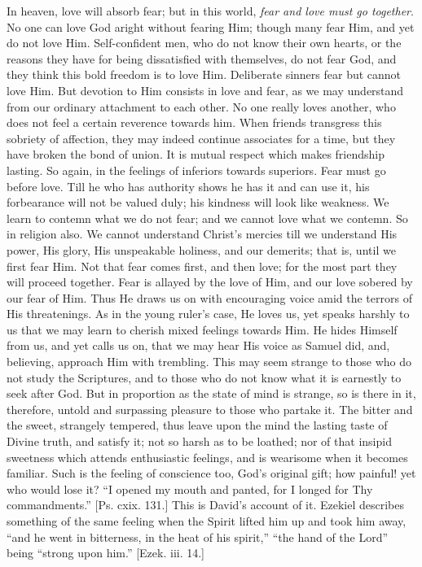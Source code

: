 In heaven, love will absorb fear; but in this world, \emph{fear
and love must go together}. No one can love God aright
without fearing Him; though many fear Him, and yet do not
love Him. Self-confident men, who do not know their own
hearts, or the reasons they have for being dissatisfied
with themselves, do not fear God, and they think this
bold freedom is to love Him. Deliberate sinners fear but
cannot love Him. But devotion to Him consists in love and
fear, as we may understand from our ordinary attachment
to each other. No one really loves another, who does not
feel a certain reverence towards him. When friends
transgress this sobriety of affection, they may indeed
continue associates for a time, but they have broken the
bond of union. It is mutual respect which makes
friendship lasting. So again, in the feelings of
inferiors towards superiors. Fear must go before love.
Till he who has authority shows he has it and can use it,
his forbearance will not be valued duly; his kindness
will look like weakness. We learn to contemn what we do
not fear; and we cannot love what we contemn. So in
religion also. We cannot understand Christ's mercies till
we understand His power, His glory, His unspeakable
holiness, and our demerits; that is, until we first fear
Him. Not that fear comes first, and then love; for the
most part they will proceed together. Fear is allayed by
the love of Him, and our love sobered by our fear of Him.
Thus He draws us on with encouraging voice amid the
terrors of His threatenings. As in the young ruler's
case, He loves us, yet speaks harshly to us that we may
learn to cherish mixed feelings towards Him. He hides
Himself from us, and yet calls us on, that we may hear
His voice as Samuel did, and, believing, approach Him
with trembling. This may seem strange to those who do not
study the Scriptures, and to those who do not know what
it is earnestly to seek after God. But in proportion as
the state of mind is strange, so is there in it,
therefore, untold and surpassing pleasure to those who partake it. The bitter and the sweet, strangely tempered,
thus leave upon the mind the lasting taste of Divine
truth, and satisfy it; not so harsh as to be loathed; nor
of that insipid sweetness which attends enthusiastic
feelings, and is wearisome when it becomes familiar. Such
is the feeling of conscience too, God's original gift;
how painful! yet who would lose it? ``I opened my
mouth and panted, for I longed for Thy
commandments.'' [Ps. cxix. 131.] This is David's
account of it. Ezekiel describes something of the same
feeling when the Spirit lifted him up and took him away,
``and he went in bitterness, in the heat of his
spirit,'' ``the hand of the Lord'' being
``strong upon him.'' [Ezek. iii. 14.]

